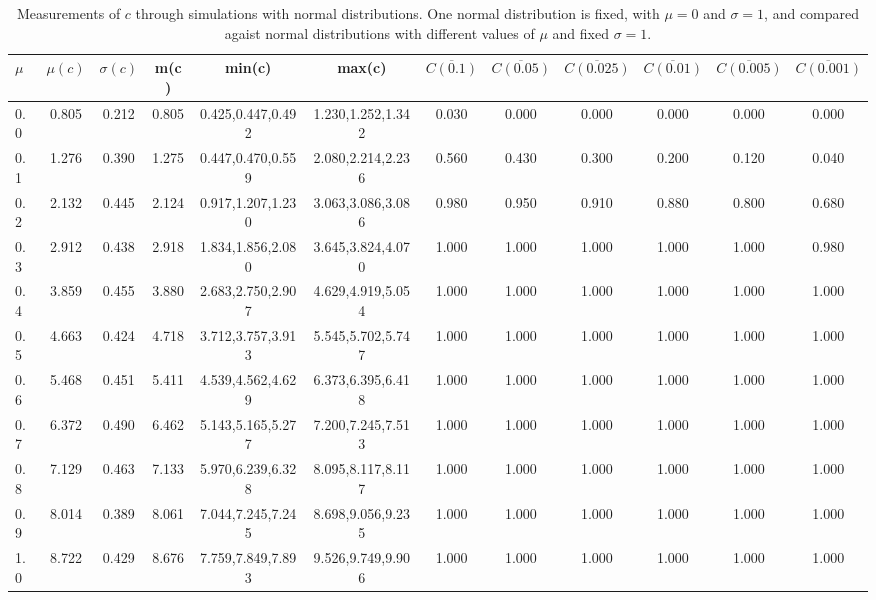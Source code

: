 \begin{table*}[h!]
\begin{center}
\begin{tabular}{| l | c | c | c | c | c | c | c | c | c | c | c |}\hline
$\mu$ & $\mu(c)$ & $\sigma(c)$ & m(c) & min(c) & max(c) & $\overline{C(0.1)}$ & $\overline{C(0.05)}$ & $\overline{C(0.025)}$ & $\overline{C(0.01)}$ & $\overline{C(0.005)}$ & $\overline{C(0.001)}$ \\\hline
0.0 & 0.805 & 0.212 & 0.805 & 0.425,0.447,0.492 & 1.230,1.252,1.342  & 0.030  & 0.000  & 0.000  & 0.000  & 0.000  & 0.000 \\\hline
0.1 & 1.276 & 0.390 & 1.275 & 0.447,0.470,0.559 & 2.080,2.214,2.236  & 0.560  & 0.430  & 0.300  & 0.200  & 0.120  & 0.040 \\\hline
0.2 & 2.132 & 0.445 & 2.124 & 0.917,1.207,1.230 & 3.063,3.086,3.086  & 0.980  & 0.950  & 0.910  & 0.880  & 0.800  & 0.680 \\\hline
0.3 & 2.912 & 0.438 & 2.918 & 1.834,1.856,2.080 & 3.645,3.824,4.070  & 1.000  & 1.000  & 1.000  & 1.000  & 1.000  & 0.980 \\\hline
0.4 & 3.859 & 0.455 & 3.880 & 2.683,2.750,2.907 & 4.629,4.919,5.054  & 1.000  & 1.000  & 1.000  & 1.000  & 1.000  & 1.000 \\\hline
0.5 & 4.663 & 0.424 & 4.718 & 3.712,3.757,3.913 & 5.545,5.702,5.747  & 1.000  & 1.000  & 1.000  & 1.000  & 1.000  & 1.000 \\\hline
0.6 & 5.468 & 0.451 & 5.411 & 4.539,4.562,4.629 & 6.373,6.395,6.418  & 1.000  & 1.000  & 1.000  & 1.000  & 1.000  & 1.000 \\\hline
0.7 & 6.372 & 0.490 & 6.462 & 5.143,5.165,5.277 & 7.200,7.245,7.513  & 1.000  & 1.000  & 1.000  & 1.000  & 1.000  & 1.000 \\\hline
0.8 & 7.129 & 0.463 & 7.133 & 5.970,6.239,6.328 & 8.095,8.117,8.117  & 1.000  & 1.000  & 1.000  & 1.000  & 1.000  & 1.000 \\\hline
0.9 & 8.014 & 0.389 & 8.061 & 7.044,7.245,7.245 & 8.698,9.056,9.235  & 1.000  & 1.000  & 1.000  & 1.000  & 1.000  & 1.000 \\\hline
1.0 & 8.722 & 0.429 & 8.676 & 7.759,7.849,7.893 & 9.526,9.749,9.906  & 1.000  & 1.000  & 1.000  & 1.000  & 1.000  & 1.000 \\\hline
\end{tabular}
\caption{Measurements of $c$ through simulations
        with normal distributions.
        One normal distribution is fixed, with $\mu=0$ and $\sigma=1$,
        and compared agaist normal distributions with different values of $\mu$ and fixed $\sigma=1$.}
\end{center}
\end{table*}